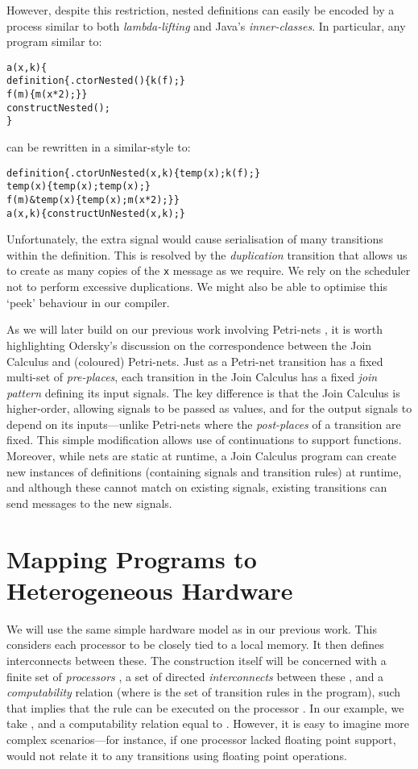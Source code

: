 \documentclass{eptcs}
\begin{document}
However, despite this restriction, nested definitions can easily be
encoded by a process similar to both {\em lambda-lifting} and Java's {\em
inner-classes}.  In particular, any program similar to:
\begin{alltt}\small
  a(x,k) \{
    definition \{ .ctor Nested() \{ k(f);     \}
                 f(m)           \{ m(x * 2); \} \}
    construct Nested();
  \}
\end{alltt}
can be rewritten in a similar-style to:
\begin{alltt}\small
  definition \{ .ctor UnNested(x,k) \{ temp(x); k(f);     \}
               temp(x)             \{ temp(x); temp(x);  \}
               f(m) & temp(x)      \{ temp(x); m(x * 2); \} \}
  a(x,k)     \{ construct UnNested(x,k); \}
\end{alltt}
Unfortunately, the extra signal would cause serialisation of many transitions
within the definition. This is resolved by the {\em duplication} transition that
allows us to create as many copies of the \texttt{x} message as we require. We
rely on the scheduler not to perform excessive duplications. We might also be
able to optimise this `peek' behaviour in our compiler.

As we will later build on our previous work involving Petri-nets
\cite{Calvert2011}, it is worth highlighting Odersky's discussion
\cite{Odersky2000} on the correspondence between the Join Calculus and
(coloured) Petri-nets.  Just as a Petri-net transition has a fixed multi-set of {\em
pre-places}, each transition in the Join Calculus has a fixed {\em join pattern}
defining its input signals.  The key difference is that the Join Calculus is
higher-order, allowing signals to be passed as values, and for the output
signals to depend on its inputs---unlike Petri-nets where the {\em post-places}
of a transition are fixed.  This simple modification allows use of continuations
to support functions.  Moreover, while nets are static at runtime, a Join
Calculus program can create new instances of definitions (containing signals and
transition rules) at runtime, and although these cannot match on existing
signals, existing transitions can send messages to the new signals.

\section{Mapping Programs to Heterogeneous Hardware}\label{sec:construction}
We will use the same simple hardware model as in our previous work. This
considers each processor to be closely tied to a local memory. It then defines
interconnects between these. The construction itself will be concerned with a
finite set of {\em processors} , a set of directed {\em interconnects}
between these , and a {\em computability} relation  (where  is the set of transition rules in the program),
such that  implies that the rule  can be executed on the
processor .  In our example, we take ,  and a computability
relation equal to .
However, it is easy to imagine more complex scenarios---for instance, if one processor lacked floating point support,  would not relate it to any transitions using floating point operations.
\end{document}
